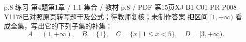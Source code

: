 \par\noindent\begin{minipage}{\linewidth}
\begin{bankitem}{p.8 练习 第4题}{第1章 / 1.1 集合 / 教材 p.8 / PDF 第15页}{XJ-B1-C01-PR-P008-Y1178}{已对照原页转写题干及公式；待教师复核；未制作答案}
把区间 $[1,+\infty)$ 看成全集，写出它的下列子集的补集：
\[A=(1,+\infty),\quad B=\{1\},\quad C=\{x\mid1\le x<5\},\quad D=[3,+\infty).\]
\end{bankitem}
\end{minipage}\par\medskip
